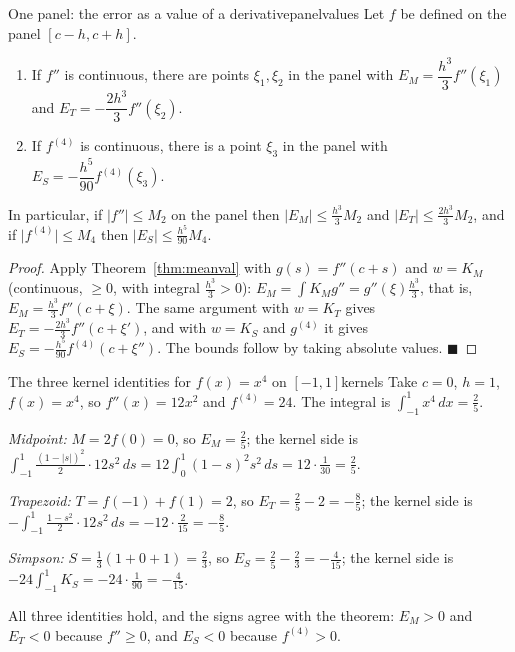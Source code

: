 \documentclass[11pt]{article}
\begin{document}
\begin{thm}{One panel: the error as a value of a derivative}{panelvalues}
Let $f$ be defined on the panel $[c-h,c+h]$.
\begin{enumerate}[label=(\arabic*),leftmargin=*]
  \item If $f''$ is continuous, there are points $\xi_1,\xi_2$ in the panel with $E_M=\dfrac{h^3}3f''(\xi_1)$ and $E_T=-\dfrac{2h^3}3f''(\xi_2)$.
  \item If $f^{(4)}$ is continuous, there is a point $\xi_3$ in the panel with $E_S=-\dfrac{h^5}{90}f^{(4)}(\xi_3)$.
\end{enumerate}
In particular, if $\lvert f''\rvert\le M_2$ on the panel then $\lvert E_M\rvert\le\frac{h^3}3M_2$ and $\lvert E_T\rvert\le\frac{2h^3}3M_2$, and if $\lvert f^{(4)}\rvert\le M_4$ then $\lvert E_S\rvert\le\frac{h^5}{90}M_4$.
\end{thm}
\begin{proof}
Apply Theorem~\ref{thm:meanval} with $g(s)=f''(c+s)$ and $w=K_M$ (continuous, $\ge0$, with integral $\frac{h^3}3>0$): $E_M=\int K_Mg''=g''(\xi)\frac{h^3}3$, that is, $E_M=\frac{h^3}3f''(c+\xi)$. The same argument with $w=K_T$ gives $E_T=-\frac{2h^3}3f''(c+\xi')$, and with $w=K_S$ and $g^{(4)}$ it gives $E_S=-\frac{h^5}{90}f^{(4)}(c+\xi'')$. The bounds follow by taking absolute values. $\blacksquare$
\end{proof}

\begin{exmp}{The three kernel identities for $f(x)=x^4$ on $[-1,1]$}{kernels}
Take $c=0$, $h=1$, $f(x)=x^4$, so $f''(x)=12x^2$ and $f^{(4)}=24$. The integral is $\int_{-1}^1x^4\,dx=\frac25$.

\emph{Midpoint:} $M=2f(0)=0$, so $E_M=\frac25$; the kernel side is $\int_{-1}^1\frac{(1-\lvert s\rvert)^2}2\cdot12s^2\,ds=12\int_0^1(1-s)^2s^2\,ds=12\cdot\frac1{30}=\frac25$.

\emph{Trapezoid:} $T=f(-1)+f(1)=2$, so $E_T=\frac25-2=-\frac85$; the kernel side is $-\int_{-1}^1\frac{1-s^2}2\cdot12s^2\,ds=-12\cdot\frac2{15}=-\frac85$.

\emph{Simpson:} $S=\frac13(1+0+1)=\frac23$, so $E_S=\frac25-\frac23=-\frac4{15}$; the kernel side is $-24\int_{-1}^1K_S=-24\cdot\frac1{90}=-\frac4{15}$.

All three identities hold, and the signs agree with the theorem: $E_M>0$ and $E_T<0$ because $f''\ge0$, and $E_S<0$ because $f^{(4)}>0$.
\end{exmp}
\end{document}
